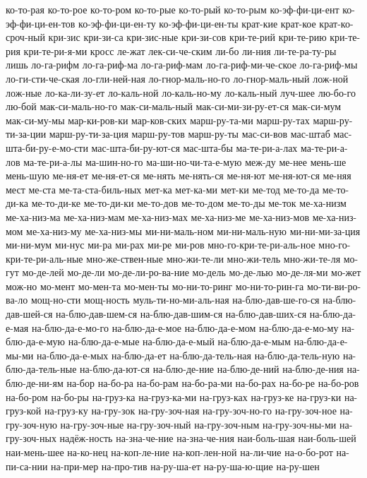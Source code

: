 {ко-то-рая
ко-то-рое
ко-то-ром
ко-то-рые
ко-то-рый
ко-то-рым
ко-эф-фи-ци-ент
ко-эф-фи-ци-ен-тов
ко-эф-фи-ци-ен-ту
ко-эф-фи-ци-ен-ты
крат-кие
крат-кое
крат-ко-сроч-ный
кри-зис
кри-зи-са
кри-зис-ные
кри-зи-сов
кри-те-рий
кри-те-рию
кри-те-рия
кри-те-ри-я-ми
кросс
ле-жат
лек-си-че-ским
ли-бо
ли-ния
ли-те-ра-ту-ры
лишь
ло-га-рифм
ло-га-риф-ма
ло-га-риф-мам
ло-га-риф-ми-че-ское
ло-га-риф-мы
ло-ги-сти-че-ская
ло-гли-ней-ная
ло-гнор-маль-но-го
ло-гнор-маль-ный
лож-ной
лож-ные
ло-ка-ли-зу-ет
ло-каль-ной
ло-каль-но-му
ло-каль-ный
луч-шее
лю-бо-го
лю-бой
мак-си-маль-но-го
мак-си-маль-ный
мак-си-ми-зи-ру-ет-ся
мак-си-мум
мак-си-му-мы
мар-ки-ров-ки
мар-ков-ских
марш-ру-та-ми
марш-ру-тах
марш-ру-ти-за-ции
марш-ру-ти-за-ция
марш-ру-тов
марш-ру-ты
мас-си-вов
мас-штаб
мас-шта-би-ру-е-мо-сти
мас-шта-би-ру-ют-ся
мас-шта-бы
ма-те-ри-а-лах
ма-те-ри-а-лов
ма-те-ри-а-лы
ма-шин-но-го
ма-ши-но-чи-та-е-мую
меж-ду
ме-нее
мень-ше
мень-шую
ме-ня-ет
ме-ня-ет-ся
ме-нять
ме-нять-ся
ме-ня-ют
ме-ня-ют-ся
ме-няя
мест
ме-ста
ме-та-ста-биль-ных
мет-ка
мет-ка-ми
мет-ки
ме-тод
ме-то-да
ме-то-ди-ка
ме-то-ди-ке
ме-то-ди-ки
ме-то-дов
ме-то-дом
ме-то-ды
ме-ток
ме-ха-низм
ме-ха-низ-ма
ме-ха-низ-мам
ме-ха-низ-мах
ме-ха-низ-ме
ме-ха-низ-мов
ме-ха-низ-мом
ме-ха-низ-му
ме-ха-низ-мы
ми-ни-маль-ном
ми-ни-маль-ную
ми-ни-ми-за-ция
ми-ни-мум
ми-нус
ми-ра
ми-рах
ми-ре
ми-ров
мно-го-кри-те-ри-аль-ное
мно-го-кри-те-ри-аль-ные
мно-же-ствен-ные
мно-жи-те-ли
мно-жи-тель
мно-жи-те-ля
мо-гут
мо-де-лей
мо-де-ли
мо-де-ли-ро-ва-ние
мо-дель
мо-де-лью
мо-де-ля-ми
мо-жет
мож-но
мо-мент
мо-мен-та
мо-мен-ты
мо-ни-то-ринг
мо-ни-то-рин-га
мо-ти-ви-ро-ва-ло
мощ-но-сти
мощ-ность
муль-ти-но-ми-аль-ная
на-блю-дав-ше-го-ся
на-блю-дав-шей-ся
на-блю-дав-шем-ся
на-блю-дав-шим-ся
на-блю-дав-ших-ся
на-блю-да-е-мая
на-блю-да-е-мо-го
на-блю-да-е-мое
на-блю-да-е-мом
на-блю-да-е-мо-му
на-блю-да-е-мую
на-блю-да-е-мые
на-блю-да-е-мый
на-блю-да-е-мым
на-блю-да-е-мы-ми
на-блю-да-е-мых
на-блю-да-ет
на-блю-да-тель-ная
на-блю-да-тель-ную
на-блю-да-тель-ные
на-блю-да-ют-ся
на-блю-де-ние
на-блю-де-ний
на-блю-де-ния
на-блю-де-ни-ям
на-бор
на-бо-ра
на-бо-рам
на-бо-ра-ми
на-бо-рах
на-бо-ре
на-бо-ров
на-бо-ром
на-бо-ры
на-груз-ка
на-груз-ка-ми
на-груз-ках
на-груз-ке
на-груз-ки
на-груз-кой
на-груз-ку
на-гру-зок
на-гру-зоч-ная
на-гру-зоч-но-го
на-гру-зоч-ное
на-гру-зоч-ную
на-гру-зоч-ные
на-гру-зоч-ный
на-гру-зоч-ным
на-гру-зоч-ны-ми
на-гру-зоч-ных
надёж-ность
на-зна-че-ние
на-зна-че-ния
наи-боль-шая
наи-боль-шей
наи-мень-шее
на-ко-нец
на-коп-ле-ние
на-коп-лен-ной
на-ли-чие
на-о-бо-рот
на-пи-са-нии
на-при-мер
на-про-тив
на-ру-ша-ет
на-ру-ша-ю-щие
на-ру-шен
}
